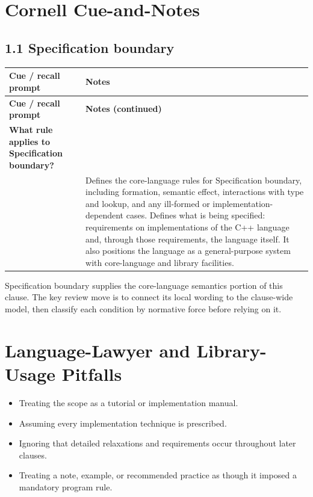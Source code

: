 \documentclass[11pt,letterpaper]{article}
\begin{document}
\section{Cornell Cue-and-Notes}
\subsection*{1.1 Specification boundary}
\begin{longtable}{@{}>{\RaggedRight\arraybackslash\columncolor{CornellReferenceCueGray}}p{}>{\RaggedRight\arraybackslash}p{}@{}}
\rowcolor{CornellReferenceNavy}\color{white}\textbf{Cue / recall prompt} & \color{white}\textbf{Notes}\\\endfirsthead
\rowcolor{CornellReferenceNavy}\color{white}\textbf{Cue / recall prompt} & \color{white}\textbf{Notes (continued)}\\\endhead
\arrayrulecolor{CornellReferenceLineGray}
\textbf{What rule applies to Specification boundary?}\\[-1mm]{\scriptsize\CornellClauseRef{1.1} [intro.\allowbreak{}scope]} & Defines the core-language rules for Specification boundary, including formation, semantic effect, interactions with type and lookup, and any ill-formed or implementation-dependent cases. Defines what is being specified: requirements on implementations of the C++ language and, through those requirements, the language itself. It also positions the language as a general-purpose system with core-language and library facilities.\\\hline
\end{longtable}
\begin{CornellReferenceSummaryBox}Specification boundary supplies the core-language semantics portion of this clause. The key review move is to connect its local wording to the clause-wide model, then classify each condition by normative force before relying on it.\end{CornellReferenceSummaryBox}
\section{Language-Lawyer and Library-Usage Pitfalls}
\begin{CornellReferencePitfallBox}\begin{itemize}[label=\textcolor{CornellReferenceAmber}{$\blacktriangleright$}]
\item Treating the scope as a tutorial or implementation manual.
\item Assuming every implementation technique is prescribed.
\item Ignoring that detailed relaxations and requirements occur throughout later clauses.
\item Treating a note, example, or recommended practice as though it imposed a mandatory program rule.
\end{itemize}\end{CornellReferencePitfallBox}
\end{document}
